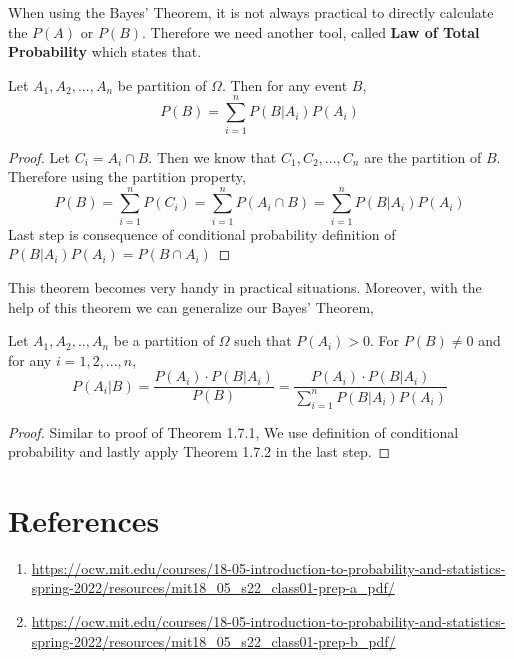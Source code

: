 \par 

When using the Bayes' Theorem, it is not always practical to directly calculate the $P(A)$ or $P(B)$. Therefore we need another tool, called \textbf{Law of Total Probability} which states that.
\\
\begin{theorem} Let $A_1,A_2,...,A_n$ be partition of $\Omega$. Then for any event $B$,
    $$P(B)= \sum_{i=1}^n P(B|A_i)P(A_i)$$
    
\end{theorem}
\begin{proof}
    Let $C_i=A_i \cap B$. Then we know that $C_1,C_2,...,C_n$ are the partition of $B$. Therefore using the partition property,
    $$ P(B)= \sum_{i=1}^n P(C_i) = \sum_{i=1}^n P(A_i \cap B) =\sum_{i=1}^n P(B|A_i)P(A_i) $$
    Last step is consequence of conditional probability definition of $P(B|A_i)P(A_i)=P(B \cap A_i)$
\end{proof}

\par
This theorem becomes very handy in practical situations. Moreover, with the help of this theorem we can generalize our Bayes' Theorem,

\begin{theorem} Let $A_1,A_2,..,A_n$ be a partition of $\Omega$ such that $P(A_i) > 0$. For $P(B) \neq 0$ and for any $i=1,2,...,n$,
    $$ P(A_i|B) = \frac{P(A_i) \cdot P(B|A_i)}{P(B)} =  \frac{P(A_i) \cdot P(B|A_i)}{\sum_{i=1}^n P(B|A_i)P(A_i) }$$
\end{theorem}
\begin{proof}
    Similar to proof of Theorem 1.7.1, We use definition of conditional probability and  lastly apply Theorem 1.7.2  in the last step.
\end{proof}

\section{References}
\begin{enumerate}
    \item \url{https://ocw.mit.edu/courses/18-05-introduction-to-probability-and-statistics-spring-2022/resources/mit18_05_s22_class01-prep-a_pdf/}
    \item \url{https://ocw.mit.edu/courses/18-05-introduction-to-probability-and-statistics-spring-2022/resources/mit18_05_s22_class01-prep-b_pdf/}
\end{enumerate}

